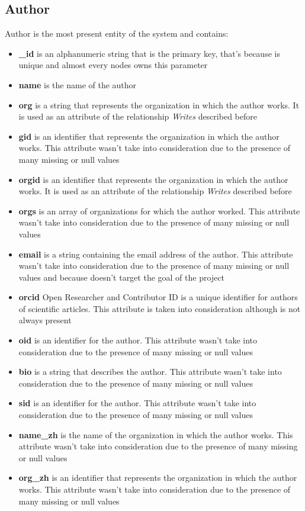 \documentclass{Configuration_Files/PoliMi3i_thesis}
\begin{document}
\subsection{Author}
Author is the most present entity of the system and contains:
\begin{itemize}
    \item \textbf{\_id} is an alphanumeric string that is the primary key, that's because is unique and almost every nodes
            owns this parameter
    \item \textbf{name} is the name of the author
    \item \textbf{org} is a string that represents the organization in which the author works. It is used as an attribute 
            of the relationship \emph{Writes} described before
    \item \textbf{gid} is an identifier that represents the organization in which the author works. This attribute wasn't
            take into consideration due to the presence of many missing or null values
    \item \textbf{orgid} is an identifier that represents the organization in which the author works. It is used as an 
            attribute of the relationship \emph{Writes} described before
    \item \textbf{orgs} is an array of organizations for which the author worked. This attribute wasn't take into 
            consideration due to the presence of many missing or null values
    \item \textbf{email} is a string containing the email address of the author. This attribute wasn't take into
            consideration due to the presence of many missing or null values and because doesn't target the goal of the 
            project
    \item \textbf{orcid} Open Researcher and Contributor ID is a unique identifier for authors of scientific articles.
            This attribute is taken into consideration although is not always present
    \item \textbf{oid} is an identifier for the author. This attribute wasn't take into consideration due to the
            presence of many missing or null values
    \item \textbf{bio} is a string that describes the author. This attribute wasn't take into consideration due to 
            the presence of many missing or null values   
    \item \textbf{sid} is an identifier for the author. This attribute wasn't take into consideration due to the
            presence of many missing or null values
    \item \textbf{name\_zh} is the name of the organization in which the author works. This attribute wasn't take
            into consideration due to the presence of many missing or null values
    \item \textbf{org\_zh} is an identifier that represents the organization in which the author works. This attribute
            wasn't take into consideration due to the presence of many missing or null values
\end{itemize}
\bigskip
\end{document}
